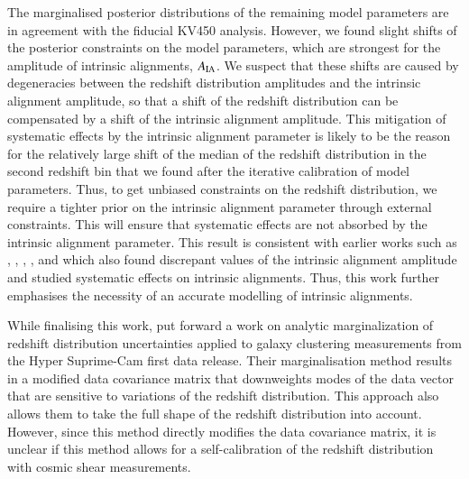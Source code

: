 \documentclass{aa}
\begin{document}
The marginalised posterior distributions of the remaining model parameters are in agreement with the fiducial KV450 analysis. However, we found slight shifts of the posterior constraints on the model parameters, which are strongest for the amplitude of intrinsic alignments, $A_{\rm IA}$. We suspect that these shifts are caused by degeneracies between the redshift distribution amplitudes and the intrinsic alignment amplitude, so that a shift of the redshift distribution can be compensated by a shift of the intrinsic alignment amplitude. This mitigation of systematic effects by the intrinsic alignment parameter is likely to be the reason for the relatively large shift of the median of the redshift distribution in the second redshift bin that we found after the iterative calibration of model parameters. Thus, to get unbiased constraints on the redshift distribution, we require a tighter prior on the intrinsic alignment parameter through external constraints. This will ensure that systematic effects are not absorbed by the intrinsic alignment parameter. This result is consistent with earlier works such as \cite{wright_som_kv450}, \cite{hildebrandt18}, \cite{fortuna20}, \cite{vanUitert18}, and \cite{Efstathiou18} which also found discrepant values of the intrinsic alignment amplitude and studied systematic effects on intrinsic alignments. Thus, this work further emphasises the necessity of an accurate modelling of intrinsic alignments.

While finalising this work, \cite{Hadzhiyska20} put forward a work on analytic marginalization of redshift distribution uncertainties applied to galaxy clustering measurements from the Hyper Suprime-Cam first data release. Their marginalisation method results in a modified data covariance matrix that downweights modes of the data vector that are sensitive to variations of the redshift distribution. This approach also allows them to take the full shape of the redshift distribution into account. However, since this method directly modifies the data covariance matrix, it is unclear if this method allows for a self-calibration of the redshift distribution with cosmic shear measurements. 
\end{document}
